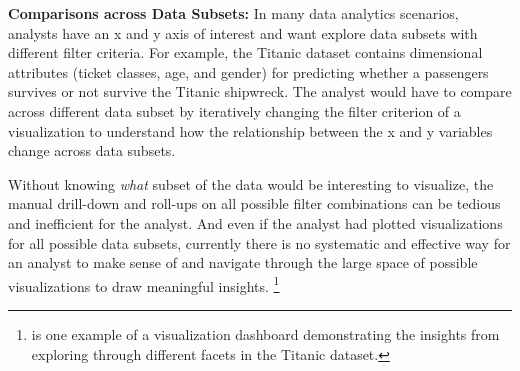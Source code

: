 \textbf{Comparisons across Data Subsets:} In many data analytics scenarios, analysts have an x and y axis of interest and want explore data subsets with different filter criteria. For example, the Titanic dataset contains dimensional attributes (ticket classes, age, and gender) for predicting whether a passengers survives or not survive the Titanic shipwreck. The analyst would have to compare across different data subset by iteratively changing the filter criterion of a visualization to understand how the relationship between the x and y variables change across data subsets.
\par Without knowing \textit{what} subset of the data would be interesting to visualize, the manual drill-down and roll-ups on all possible filter combinations can be tedious and inefficient for the analyst. And even if the analyst had plotted visualizations for all possible data subsets, currently there is no systematic and effective way for an analyst to make sense of and navigate through the large space of possible visualizations to draw meaningful insights. \footnote{\cite{anand} is one example of a visualization dashboard demonstrating the insights from exploring through different facets in the Titanic dataset.}

